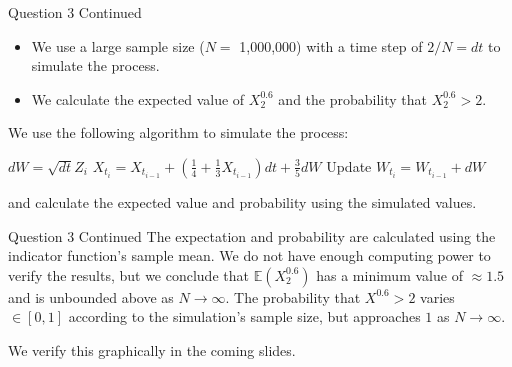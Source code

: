 \documentclass[compress,12pt]{beamer}
\begin{document}
\begin{frame}{Question 3 Continued}
    \begin{itemize}
        \item We use a large sample size ($N = $ 1,000,000) with a time step of $2 / N = dt$ to simulate the process.
        \item We calculate the expected value of $X_{2}^{0.6}$ and the probability that $X_{2}^{0.6} > 2$.
    \end{itemize}
    We use the following algorithm to simulate the process:
    
    \begin{algorithmic}
            \State $dW = \sqrt{dt} Z_i$
            \State $X_{t_i} = X_{t_{i-1}} + \left( \frac{1}{4} + \frac{1}{3}X_{t_{i-1}} \right) dt + \frac{3}{5} dW$
            \State Update $W_{t_i} = W_{t_{i-1}} + dW$
        \EndFor
    \end{algorithmic}

    and calculate the expected value and probability using the simulated values.

\end{frame}

\begin{frame}{Question 3 Continued}
    The expectation and probability are calculated using the indicator function's sample mean.
    We do not have enough computing power to verify the results, but we conclude that $\mathbb{E}(X^{0.6}_2)$ has a {\color{red} minimum} value of $\approx 1.5$
    and is {\color{red} unbounded} above as $N \to \infty$. The probability that $X^{0.6} > 2$ varies $\in[0,1]$ according to the simulation's sample size, but 
    approaches $1$ as $N \to \infty$.
    
    We verify this graphically in the coming slides.
\end{frame}
\end{document}
